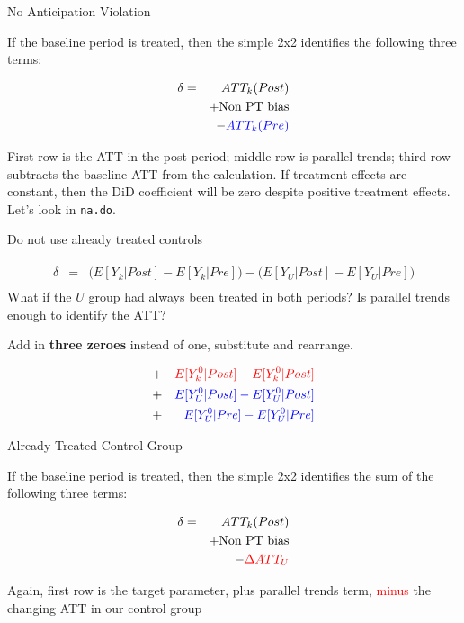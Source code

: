\documentclass{beamer}
\begin{document}
\begin{frame}{No Anticipation Violation}

If the baseline period is treated, then the simple 2x2 identifies the following three terms:

\begin{eqnarray*}
\delta &=& ATT_k(Post) \\&&+ \text{Non PT bias} \\&&- \textcolor{blue}{ATT_k(Pre)}
\end{eqnarray*}

First row is the ATT in the post period; middle row is parallel trends; third row subtracts the baseline ATT from the calculation. If treatment effects are constant, then the DiD coefficient will be zero despite positive treatment effects.  Let's look in \texttt{na.do}.

\end{frame}

\begin{frame}{Do not use already treated controls}


\begin{eqnarray*}
\widehat{\delta} &=& \bigg ( E[Y_k|Post] - E[Y_k|Pre] \bigg ) - \bigg ( E[Y_U | Post ] - E[ Y_U | Pre] \bigg) \\
\end{eqnarray*}What if the $U$ group had always been treated in both periods? Is parallel trends enough to identify the ATT?

\bigskip

Add in \textbf{three zeroes} instead of one, substitute and rearrange.

\begin{eqnarray*}
&+& \textcolor{red}{E[Y^0_k|Post] - E[Y^0_k|Post]} \\
&+& \textcolor{blue}{E[Y^0_U|Post] - E[Y^0_U|Post]}  \\
&+& \textcolor{blue}{E[Y^0_U|Pre] - E[Y^0_U|Pre]} 
\end{eqnarray*}

\end{frame}

\begin{frame}{Already Treated Control Group}

If the baseline period is treated, then the simple 2x2 identifies the sum of the following three terms:

\begin{eqnarray*}
\delta &=& ATT_k(Post) \\&&+ \text{Non PT bias} \\&&- \textcolor{red}{\Delta ATT_U}
\end{eqnarray*}

Again, first row is the target parameter, plus parallel trends term, \textcolor{red}{minus} the changing ATT in our control group

\end{frame}
\end{document}
